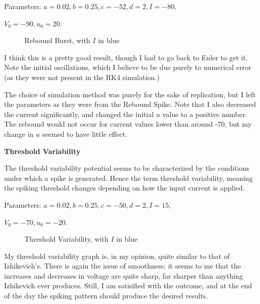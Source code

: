\documentclass[a4paper,12pt]{article}
\begin{document}
Parameters: $a=0.02, b=0.25, c=-52, d=2, I=-80, $

\vspace{1mm}

$V_{0}=-90, u_{0}=20$. 

\begin{figure}[h!]
\begin{center}
\end{center}
\caption{\label{pict14}Rebound Burst, with $I$ in blue}
\end{figure}

I think this is a pretty good result, though I had to go back to Euler to get it. Note the initial oscillations, which I believe to be due purely to numerical error (as they were not present in the RK4 simulation.) 

\vspace{2mm}

The choice of simulation method was purely for the sake of replication, but I left the parameters as they were from the Rebound Spike. Note that I also decreased the current significantly, and changed the initial $u$ value to a positive number. The rebound would not occur for current values lower than around -70, but my change in $u$ seemed to have little effect. 

\vfil\eject

{\bf Threshold Variability}
\bigskip

The threshold variability potential seems to be characterized by the conditions under which a spike is generated. Hence the term threshold variability, meaning the spiking threshold changes depending on how the input current is applied.  
 
\vspace{2mm} 

Parameters: $a=0.02, b=0.25, c=-50, d=2, I=15, $

\vspace{1mm}

$V_{0}=-70, u_{0}=-20$. 

\begin{figure}[h!]
\begin{center}
\end{center}
\caption{\label{pict15}Threshold Variability, with $I$ in blue}
\end{figure}

My threshold variability graph is, in my opinion, quite similar to that of Izhikevich's. There is again the issue of smoothness; it seems to me that the increases and decreases in voltage are quite sharp, far sharper than anything Izhikevich ever produces. Still, I am satisified with the outcome, and at the end of the day the spiking pattern should produce the desired results. 
\end{document}
